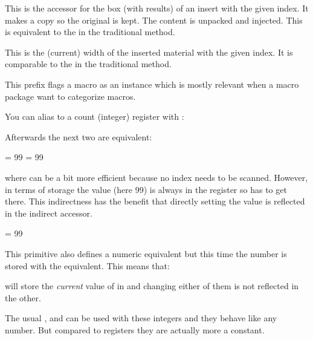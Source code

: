 \stopnewprimitive

\startnewprimitive[title={\prm {insertuncopy}}]

This is the accessor for the box (with results) of an insert with the given
index. It makes a copy so the original is kept. The content is unpacked and
injected. This is equivalent to the  in the traditional method.

\stopnewprimitive

\startnewprimitive[title={\prm {insertwidth}}]

This is the (current) width of the inserted material with the given index. It is
comparable to the  in the traditional method.

\stopnewprimitive

\startnewprimitive[title={\prm {instance}}]

This prefix flags a macro as an instance which is mostly relevant when a macro
package want to categorize macros.

\stopnewprimitive

\startnewprimitive[title={\prm {integerdef}}]

You can alias to a count (integer) register with :

\starttyping
\countdef{}
\stoptyping

Afterwards the next two are equivalent:

\starttyping
\MyCount   = 99
 = 99
\stoptyping

where \type {\MyCount} can be a bit more efficient because no index needs to be
scanned. However, in terms of storage the value (here 99) is always in the register
so \type {\MyCount} has to get there. This indirectness has the benefit that directly
setting the value is reflected in the indirect accessor.

\starttyping
\integerdef\MyCount = 99
\stoptyping

This primitive also defines a numeric equivalent but this time the number is stored
with the equivalent. This means that:

\starttyping
\let\MyCopyOfCount = \MyCount
\stoptyping

will store the {\em current} value of \type {\MyCount} in \type {\MyCopyOfCount} and
changing either of them is not reflected in the other.

The usual ,  and  can be used with these
integers and they behave like any number. But compared to registers they are actually
more a constant.

